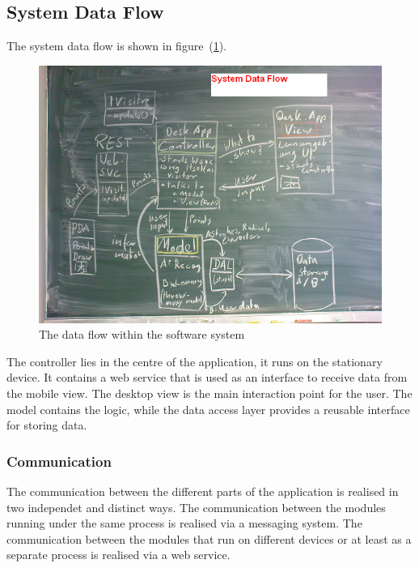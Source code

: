 \subsection{System Data Flow}
\label{sec:arch:systemdataflow}
The system data flow is shown in figure~(\ref{fig:systemdataflow}).
\begin{figure}[htbp]
\begin{center}
\includegraphics[scale=0.5]{images/TechnicalDesign/SystemDataFlow.png}
\caption{The data flow within the software system}
\label{fig:systemdataflow}
\end{center}
\end{figure}
The controller lies in the centre of the application, it runs on the stationary
device. It contains a web service that is used as an interface to receive data 
from the mobile view. The desktop view is the main interaction point for the 
user. The model contains the logic, while the data access layer provides a 
reusable interface for storing data. 

\subsubsection{Communication}
\label{sec:communication}

The communication between the different parts of the application is realised 
in two independet and distinct ways. The communication between the 
modules running under the same process is realised via a messaging system. 
The communication between the modules that run on different devices
or at least as a separate process is realised via a web service.

